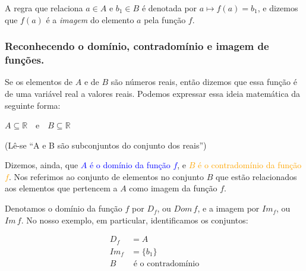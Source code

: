 \documentclass[12pt,openright,twoside,a4paper]{article}
\theoremstyle{definition}
\begin{document}
	A regra que relaciona $a \in A$ e $b_1 \in B$ é denotada por $a \mapsto f(a) = b_1$, e dizemos que $f(a)$ é a \textit{imagem} do elemento $a$ pela função $f$.

	
	\subsubsection{Reconhecendo o domínio, contradomínio e imagem de funções.}
	
	Se os elementos de $A$ e de $B$ são números reais, então dizemos que essa função é de uma variável real a valores reais. Podemos expressar essa ideia matemática da seguinte forma:
	
	\begin{center}
		$A \subseteq \mathbb{R} \quad \text{e} \quad B \subseteq \mathbb{R}$
		
		(Lê-se ``A e B são subconjuntos do conjunto dos reais'')
	\end{center}

	
	Dizemos, ainda, que \textcolor{blue}{$A$ é o domínio da função $f$}, e \textcolor{orange}{$B$ é o contradomínio da função $f$}. Nos referimos ao conjunto de elementos no conjunto $B$ que estão relacionados aos elementos que pertencem a $A$ como imagem da função $f$.
	
	Denotamos o domínio da função $f$ por $D_f$, ou $Dom\,f$, e a imagem por $Im_f$, ou $Im\,f$. No nosso exemplo, em particular, identificamos os conjuntos:
	
	\begin{align*}
		D_f &= A\\
		Im_f &= \{b_1\}\\
		B &\text{ é o contradomínio}
	\end{align*}
	
\end{document}
